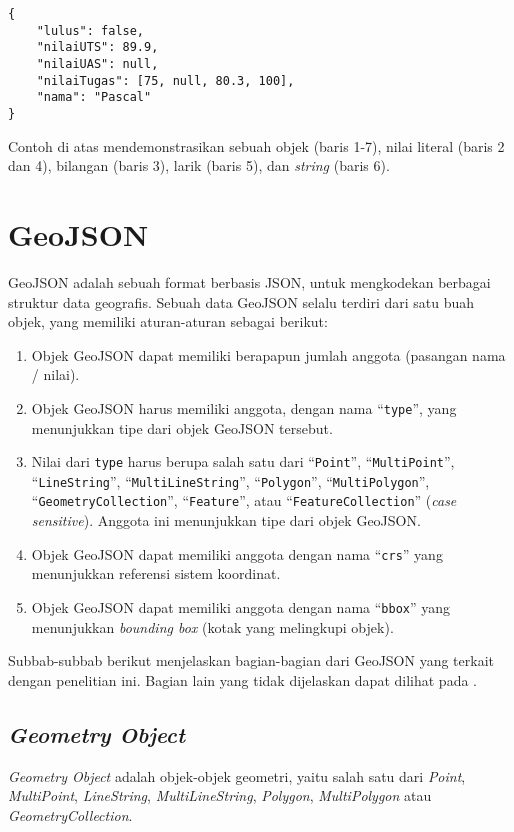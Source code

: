 \begin{lstlisting}
{
	"lulus": false,
	"nilaiUTS": 89.9,
	"nilaiUAS": null,
	"nilaiTugas": [75, null, 80.3, 100],
	"nama": "Pascal"
}
\end{lstlisting}

Contoh di atas mendemonstrasikan sebuah objek (baris 1-7), nilai literal (baris 2 dan 4), bilangan (baris 3), larik (baris 5), dan \textit{string} (baris 6).

\section{GeoJSON}

GeoJSON adalah sebuah format berbasis JSON, untuk mengkodekan berbagai struktur data geografis\cite{geojson}. Sebuah data GeoJSON selalu terdiri dari satu buah objek, yang memiliki aturan-aturan sebagai berikut:

\begin{enumerate}
	\item Objek GeoJSON dapat memiliki berapapun jumlah anggota (pasangan nama / nilai).
	\item Objek GeoJSON harus memiliki anggota, dengan nama ``\texttt{type}'', yang menunjukkan tipe dari objek GeoJSON tersebut.
	\item Nilai dari \texttt{type} harus berupa salah satu dari ``\texttt{Point}'', ``\texttt{MultiPoint}'', ``\texttt{LineString}'', ``\texttt{MultiLineString}'', ``\texttt{Polygon}'', ``\texttt{MultiPolygon}'', ``\texttt{GeometryCollection}'', ``\texttt{Feature}'', atau ``\texttt{FeatureCollection}'' (\textit{case sensitive}). Anggota ini menunjukkan tipe dari objek GeoJSON.
	\item Objek GeoJSON dapat memiliki anggota dengan nama ``\texttt{crs}'' yang menunjukkan referensi sistem koordinat.
	\item Objek GeoJSON dapat memiliki anggota dengan nama ``\texttt{bbox}'' yang menunjukkan \textit{bounding box} (kotak yang melingkupi objek).
\end{enumerate}

Subbab-subbab berikut menjelaskan bagian-bagian dari GeoJSON yang terkait dengan penelitian ini. Bagian lain yang tidak dijelaskan dapat dilihat pada \cite{geojson}.

\subsection{\textit{Geometry Object}}

\textit{Geometry Object} adalah objek-objek geometri, yaitu salah satu dari \textit{Point}, \textit{MultiPoint}, \textit{LineString}, \textit{MultiLineString}, \textit{Polygon}, \textit{MultiPolygon} atau \textit{GeometryCollection}.

